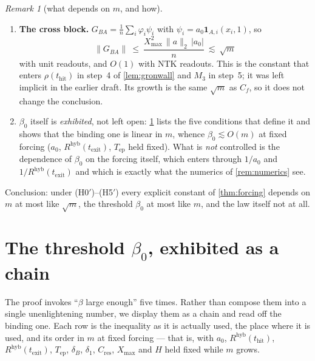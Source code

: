 \documentclass[11pt]{article}
\theoremstyle{definition}
\theoremstyle{remark}
\newtheorem{remark}{Remark}
\newcommand{\hyb}{\mathrm{hyb}}
\newcommand{\thit}{t_{\mathrm{hit}}}
\newcommand{\texit}{t_{\mathrm{exit}}}
\newcommand{\Tep}{T_{\mathrm{ep}}}
\begin{document}
\begin{remark}[what depends on $m$, and how]
\begin{enumerate}
it. See row~5 of \cref{sec:beta0}.
\item[(U-new)] \textbf{The cross block.} $G_{BA}=\frac1n\sum_i\varphi_i\psi_i$
with $\psi_i=a_0\mathbf1_{A,i}(x_i,1)$, so
\[
\|G_{BA}\|\ \le\ \frac{X_{\max}^2\,\|a\|_2\,|a_0|}{n}\ \lesssim\ \sqrt m
\]
with unit readouts, and $O(1)$ with NTK readouts. This is the constant that
enters $\rho(\thit)$ in step~4 of \cref{lem:gronwall} and $M_3$ in step~5; it was
left implicit in the earlier draft. Its growth is the same $\sqrt m$ as $C_f$,
so it does not change the conclusion.
\item[(U6)] $\beta_0$ itself is \emph{exhibited}, not left open:
\cref{sec:beta0} lists the five conditions that define it and shows that the
binding one is linear in $m$, whence $\beta_0\lesssim O(m)$ at fixed forcing
($a_0$, $R^{\hyb}(\texit)$, $\Tep$ held fixed). What is \emph{not} controlled is
the dependence of $\beta_0$ on the forcing itself, which enters through $1/a_0$
and $1/R^{\hyb}(\texit)$ and which is exactly what the numerics of
\cref{rem:numerics} see.
\end{enumerate}
Conclusion: under (H0$'$)--(H5$'$) every explicit constant of
\cref{thm:forcing} depends on $m$ at most like $\sqrt m$, the threshold $\beta_0$
at most like $m$, and the law itself not at all.
\end{remark}

\section{The threshold $\beta_0$, exhibited as a chain}\label{sec:beta0}

The proof invokes ``$\beta$ large enough'' five times. Rather than compose them
into a single unenlightening number, we display them as a chain and read off the
binding one. Each row is the inequality as it is actually used, the place where
it is used, and its order in $m$ at fixed forcing --- that is, with $a_0$,
$R^{\hyb}(\thit)$, $R^{\hyb}(\texit)$, $\Tep$, $\delta_B$, $\delta_1$,
$C_{\mathrm{res}}$, $X_{\max}$ and $H$ held fixed while $m$ grows.
\end{document}
